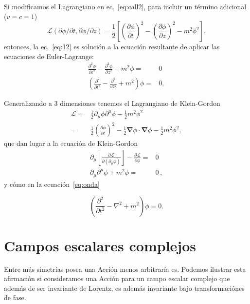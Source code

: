 Si modificamos el Lagrangiano en ec.~\eqref{eq:call2}, para incluir un
término adicional ($v=c=1$)
\begin{equation}
  \label{eq:14}
  \mathcal{L}(\partial\phi/\partial t,\partial\phi/\partial z)=\frac{1}{2}
\left[
  \left(\frac{\partial\phi}{\partial t}\right)^2-\left(\frac{\partial\phi}{\partial z}\right)^2-m^2\phi^2
\right].
\end{equation}
entonces, la ec.~\eqref{eq:12} es solución a la ecuación resultante de
aplicar las ecuaciones de Euler-Lagrange:
\begin{align}
\label{eq:150}
      \frac{\partial^2\phi}{\partial t^2}-\frac{\partial^2\phi}{\partial z^2}+m^2\phi=&0\nonumber\\
      \left(\frac{\partial^2}{\partial t^2}-\frac{\partial^2}{\partial z^2}+m^2
      \right)\phi=&0,
\end{align}

Generalizando a 3 dimensiones tenemos el Lagrangiano de Klein-Gordon
\begin{align}
  \label{eq:15}
  \mathcal{L}=&\frac12 \partial_{\mu}\phi\partial^{\mu}\phi-\frac12 m^2\phi^{2}\nonumber\\
=&\frac{1}{2}
  \left(
\frac{\partial\phi}{\partial t}
  \right)^2-\tfrac{1}{2}\boldsymbol{\nabla}\phi\cdot\boldsymbol{\nabla}\phi-\tfrac{1}{2}m^2\phi^2,
\end{align}
que dan lugar a la ecuación de Klein-Gordon
\begin{align}
   \partial_{\mu} \left[ \frac{\partial\mathcal{L}}{\partial(\partial_{\mu}\phi)}\right]-\frac{\partial\mathcal{L}}{\partial\phi}=&0 \nonumber\\
       \partial_{\mu}\partial^{\mu}\phi+m^2\phi=&0 \,,
\end{align}
y cómo en la ecuación~\eqref{eq:onda}

\begin{equation}
\label{eq:152}
  \left(
\frac{\partial^2}{\partial t^2}-\nabla^2+m^2
  \right)\phi=0.
\end{equation}






\section{Campos escalares complejos}
Entre más simetrías posea una Acción menos arbitraría es. Podemos
ilustrar esta afirmación si consideramos una Acción para un campo escalar
complejo que además de ser invariante de Lorentz, es además invariante
bajo transformaciónes de fase.

